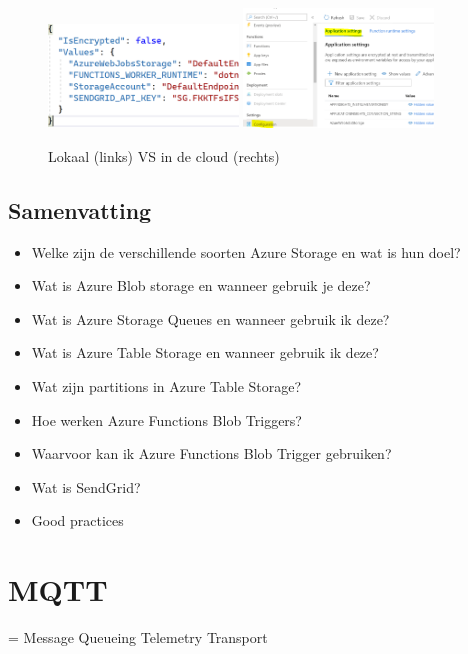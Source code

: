 \documentclass{article}
\begin{document}
\begin{figure}[H]
    \centering
    \includegraphics[width=0.45\textwidth]{configuratie-lokaal.png}
    \includegraphics[width=0.45\textwidth]{configuratie-cloud.png}
    \caption{Lokaal (links) VS in de cloud (rechts)}
\end{figure}


\subsection{Samenvatting}

\begin{itemize}
    \item Welke zijn de verschillende soorten Azure Storage en wat is hun doel?
    \item Wat is Azure Blob storage en wanneer gebruik je deze?
    \item Wat is Azure Storage Queues en wanneer gebruik ik deze?
    \item Wat is Azure Table Storage en wanneer gebruik ik deze?
    \item Wat zijn partitions in Azure Table Storage?
    \item Hoe werken Azure Functions Blob Triggers?
    \item Waarvoor kan ik Azure Functions Blob Trigger gebruiken?
    \item Wat is SendGrid?
    \item Good practices
\end{itemize}

\section{MQTT}

= Message Queueing Telemetry Transport
\end{document}
